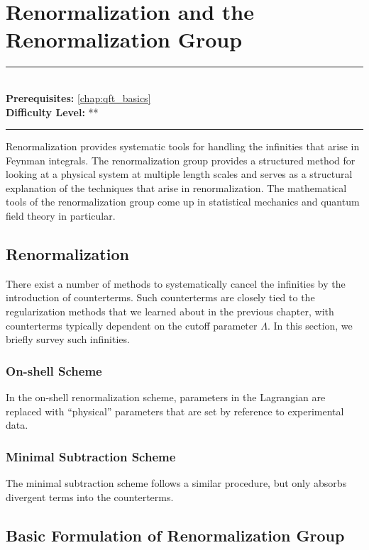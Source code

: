 \documentclass[book.tex]{subfiles}
\begin{document}
\chapter{Renormalization and the Renormalization Group}

\label{chap:renormalization_group}
\noindent\rule{11cm}{0.4pt} \\
\textbf{Prerequisites:} \autoref{chap:qft_basics}  \\
\textbf{Difficulty Level:} ** \\
\noindent\rule{11cm}{0.4pt}
\vspace{5mm}


Renormalization provides systematic tools for handling the infinities that arise in Feynman integrals. The renormalization group provides a structured method for looking at a physical system at multiple length scales and serves as a structural explanation of the techniques that arise in renormalization. The mathematical tools of the renormalization group come up in statistical mechanics and quantum field theory in particular.

\section{Renormalization}

There exist a number of methods to systematically cancel the infinities by the introduction of counterterms. Such counterterms are closely tied to the regularization methods that we learned about in the previous chapter, with counterterms typically dependent on the cutoff parameter $\Lambda$. In this section, we briefly survey such infinities.

\subsection{On-shell Scheme}

In the on-shell renormalization scheme, parameters in the Lagrangian are replaced with ``physical'' parameters that are set by reference to experimental data.

\subsection{Minimal Subtraction Scheme}
The minimal subtraction scheme follows a similar procedure, but only absorbs divergent terms into the counterterms.



\section{Basic Formulation of Renormalization Group}
\end{document}
